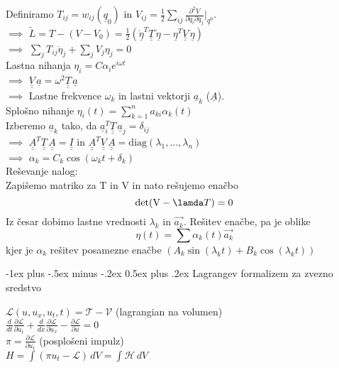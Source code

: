 \documentclass[12pt,landscape]{article}
\makeatletter
\renewcommand{\section}{\@startsection{section}{1}{0mm}%
                                {-1ex plus -.5ex minus -.2ex}%
                                {0.5ex plus .2ex}%
                                {\normalfont\large\bfseries}}
\newcommand{\uunderline}[1]{\underline{\underline{#1}}}
\makeatother
\begin{document}
\begin{multicols}{3}
Definiramo $T_{ij} = w_{ij}(\underline q_0)$ in $V_{ij} = \frac{1}{2} \sum_{ij} \frac{\partial^2 V}{\partial q_i \partial q_j}\big|_{\underline{q}^0}$. \\
$\implies$ $\tilde L = T - (V - V_0) = \frac{1}{2}(\underline{\dot \eta}^T \uunderline T \, \underline{\dot \eta} - \underline{\eta}^T \uunderline V \, \underline{\eta})$ \\
$\implies$ $\sum_j T_{ij} \ddot \eta_j + \sum_j V_j \eta_j = 0$ \medskip \\

Lastna nihanja $\eta_i = C \alpha_i e^{i \omega t}$ \\
$\implies$ $\uunderline V \, \underline a = \omega^2 \uunderline T \, \underline a$ \\
$\implies$ Lastne frekvence $\omega_k$ in lastni vektorji $\underline a_k$ ($\underline A$). \medskip \\

Splošno nihanje $\eta_i(t) = \sum_{k = 1}^{n} a_{ki} \alpha_k(t)$ \\
Izberemo $\underline a_k$ tako, da $\underline a_i^T \uunderline T \, \underline a_j = \delta_{ij}$ \\
$\implies$ $\uunderline A^T \uunderline T \, \uunderline A = \uunderline I$ in $\uunderline A^T \uunderline V \, \uunderline A = \mathrm{diag}(\lambda_1, \dots, \lambda_n)$ \\
$\implies$ $\alpha_k = C_k \cos(\omega_k t + \delta_k)$ \medskip \\


Reševanje nalog: \\
Zapišemo matriko za T in V in nato rešujemo enačbo
\begin{equation}
	\text{det}(\text{V}-\lamda T)=0
\end{equation}
Iz česar dobimo lastne vrednosti $\lambda_k$ in $\vec{a_k}$. Rešitev enačbe, pa je oblike
\begin{equation}
	\eta(t)=\sum \alpha_k(t)\vec{a_k}
\end{equation}
kjer je $\alpha_k$ rešitev posamezne enačbe $(A_k\sin(\lambda_k t)+B_k\cos(\lambda_k t))$


\section{Lagrangev formalizem za zvezno sredstvo}

$\mathcal{L}(u, u_x, u_t, t) = \mathcal{T} - \mathcal{V}$ \quad (lagrangian na volumen) \\
$\frac{d}{dt}\frac{\partial \mathcal{L}}{\partial u_t} + \frac{d}{dx} \frac{\partial \mathcal{L}}{\partial u_x} - \frac{\partial \mathcal{L}}{\partial u} = 0$ \\
$\pi = \frac{\partial \mathcal{L}}{\partial u_t}$ \quad (posplošeni impulz) \\
$H = \int (\pi u_t - \mathcal{L}) \, dV = \int \mathcal{H} \, dV$ \medskip \\


\end{multicols}
\end{document}
